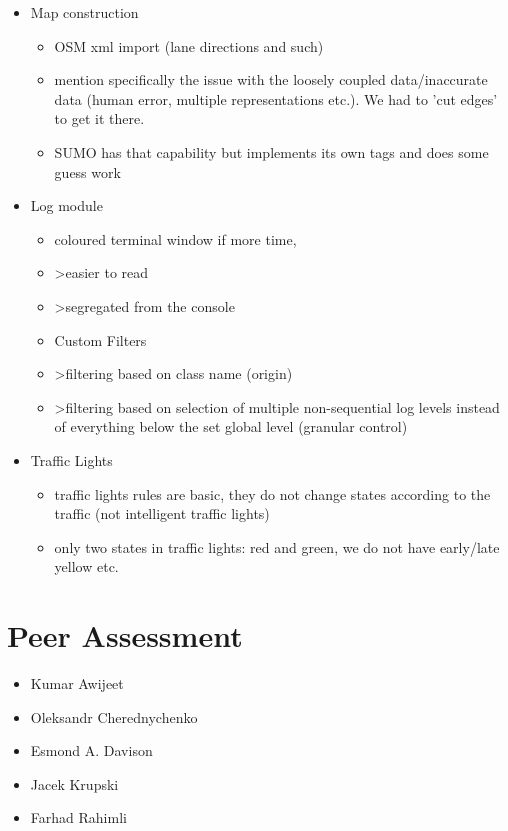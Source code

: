 \begin{itemize}
    \item Map construction
    \begin{itemize}
        \item OSM xml import (lane directions and such)
        \item mention specifically the issue with the loosely coupled data/inaccurate data (human error, multiple representations etc.). We had to 'cut edges' to get it there.
        \item SUMO has that capability but implements its own tags and does some guess work
    \end{itemize}

    \item Log module
    \begin{itemize}
        \item coloured terminal window if more time,
        \item >easier to read
        \item >segregated from the console
        \item Custom Filters
        \item >filtering based on class name (origin)
        \item >filtering based on selection of multiple non-sequential log levels instead of everything below the set global level (granular control)
    \end{itemize}

     \item Traffic Lights
     \begin{itemize}
        \item traffic lights rules are basic, they do not change states according to the traffic (not intelligent traffic lights)
        \item only two states in traffic lights: red and green, we do not have early/late yellow etc. 
     \end{itemize}
\end{itemize}



\section{Peer Assessment}

 \begin{itemize}
        \item Kumar Awijeet
		\item Oleksandr Cherednychenko
		\item Esmond A. Davison
		\item Jacek Krupski
		\item Farhad Rahimli
    \end{itemize}

